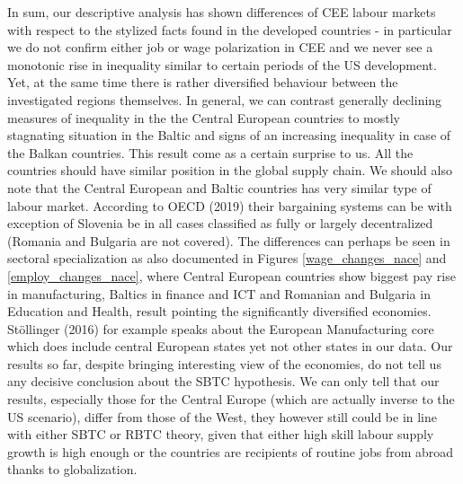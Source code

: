\documentclass{article}
\begin{document}
In sum, our descriptive analysis has shown differences of CEE labour markets with respect to the stylized facts found in the developed countries - in particular we do not confirm either job or wage polarization in CEE and we never see a monotonic rise in inequality similar to certain periods of the US development. Yet, at the same time there is rather diversified behaviour between the investigated regions themselves. In general, we can contrast generally declining measures of inequality in the the Central European countries to mostly stagnating situation in the Baltic and signs of an increasing inequality in case of the Balkan countries.
This result come as a certain surprise to us. All the countries should have similar position in the global supply chain. We should also note that the Central European and Baltic countries has very similar type of labour market. According to OECD (2019) their bargaining systems can be with exception of Slovenia be in all cases classified as fully or largely decentralized (Romania and Bulgaria are not covered).
The differences can perhaps be seen in sectoral specialization as also documented in Figures \ref{wage_changes_nace} and \ref{employ_changes_nace}, where Central European countries show biggest pay rise in manufacturing, Baltics in finance and ICT and Romanian and Bulgaria in Education and Health, result pointing the significantly diversified economies. Stöllinger (2016) for example speaks about the European Manufacturing core which does include central European states yet not other states in our data.
Our results so far, despite bringing interesting view of the economies, do not tell us any decisive conclusion about the SBTC hypothesis. We can only tell that our results, especially those for the Central Europe (which are actually inverse to the US scenario), differ from those of the West, they however still could be in line with either SBTC or RBTC theory, given that either high skill labour supply growth is high enough or the countries are recipients of routine jobs from abroad thanks to globalization.
\end{document}
